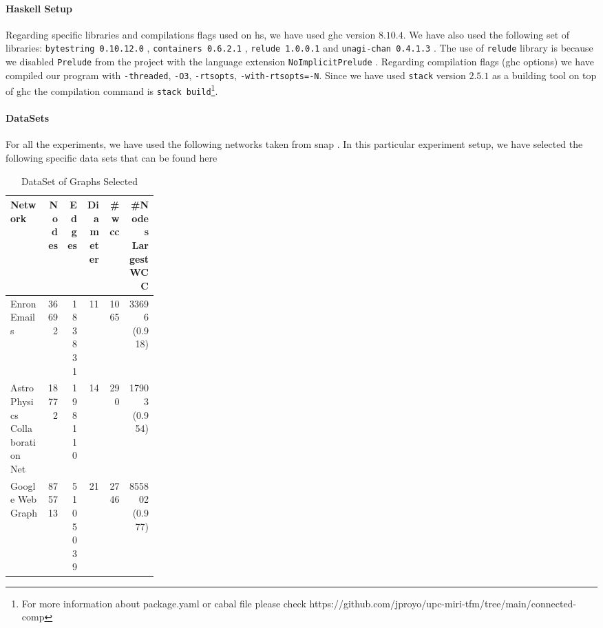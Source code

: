 \paragraph{Haskell Setup}
Regarding specific libraries and compilations flags used on \acrshort{hs}, we have used \acrshort{ghc} version $8.10.4$. We have also used the following set of libraries: \texttt{bytestring 0.10.12.0} \cite{bytestring}, \texttt{containers 0.6.2.1} \cite{containers}, \texttt{relude 1.0.0.1} \cite{relude} and \texttt{unagi-chan 0.4.1.3} \cite{unagi}. The use of \texttt{relude} library is because we disabled \texttt{Prelude} from the project with the language extension \texttt{NoImplicitPrelude} \cite{extensions}. Regarding compilation flags (\acrshort{ghc} options) we have compiled our program with \texttt{-threaded}, \texttt{-O3}, \texttt{-rtsopts}, \texttt{-with-rtsopts=-N}. Since we have used \texttt{stack} version $2.5.1$ \cite{stack} as a building tool on top of \acrshort{ghc} the compilation command is \texttt{stack build}\footnote{For more information about package.yaml or cabal file please check https://github.com/jproyo/upc-miri-tfm/tree/main/connected-comp}.

\paragraph{DataSets}\label{data:set}
For all the experiments, we have used the following networks taken from \acrshort{snap} \cite{stanford}. In this particular experiment setup, we have selected the following specific data sets that can be found here \cite{netenron, netastro, netwebgoogle}

\begin{table}[H]
  \centering
  \begin{tabular}{|p{0.25\linewidth}|r|r|r|r|r|}
   \hline
   \textbf{Network} & \textbf{Nodes} & \textbf{Edges} & \textbf{Diameter} & \textbf{\#\acrshort{wcc}} & \textbf{\#Nodes Largest WCC} \\
   \hline
   Enron Emails & 36692 & 183831 & 11 & 1065 & 33696 (0.918) \\
   \hline
   Astro Physics Collaboration Net & 18772 & 198110 & 14 & 290 & 17903 (0.954)\\
   \hline
   Google Web Graph & 875713 & 5105039 & 21 & 2746 & 855802 (0.977)\\
   \hline
  \end{tabular}
 \caption{DataSet of Graphs Selected}
 \label{table:4}
 \end{table}
 
